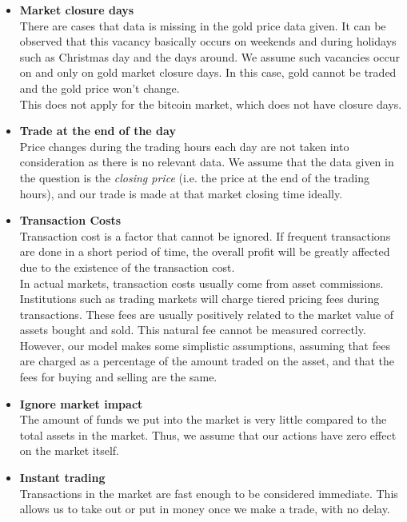 \documentclass{mcmthesis}
\begin{document}
\begin{itemize}
  \item \textbf{Market closure days}\\
  There are cases that data is missing in the gold price data given.
  It can be observed that this vacancy basically occurs on weekends
  and during holidays such as Christmas day and the days around.
  We assume such vacancies occur on and only on gold market closure days.
  In this case, gold cannot be traded and the gold price won't change.\\
  This does not apply for the bitcoin market, which does not have closure days.
  \item \textbf{Trade at the end of the day}\\
  Price changes during the trading hours each day are not taken into consideration
  as there is no relevant data.
  We assume that the data given in the question is the \textit{closing price}
  (i.e. the price at the end of the trading hours),
  and our trade is made at that market closing time ideally.
  \item \textbf{Transaction Costs}\\
  Transaction cost is a factor that cannot be ignored. If frequent transactions are done in a short period of time, the overall profit will be greatly affected due to the existence of the transaction cost.\\
  In actual markets, transaction costs usually come from asset commissions. Institutions such as trading markets will charge tiered pricing fees during transactions. These fees are usually positively related to the market value of assets bought and sold. This natural fee cannot be measured correctly. However, our model makes some simplistic assumptions, assuming that fees are charged as a percentage of the amount traded on the asset, and that the fees for buying and selling are the same.
  \item \textbf{Ignore market impact}\\
  The amount of funds we put into the market is very little
  compared to the total assets in the market.
  Thus, we assume that our actions have zero effect on the market itself.
  \item \textbf{Instant trading}\\
  Transactions in the market are fast enough to be considered immediate.
  This allows us to take out or put in money once we make a trade, with no delay.
\end{itemize}
\end{document}
